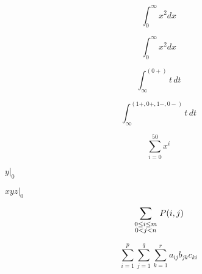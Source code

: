 \documentclass{article}
\begin{document}

\[ \int_0^\infty x^2 dx \]

\[ \int_0^\infty x^2 d\mathord{x} \]

\[ \int_\infty^{(0+)} t\,dt \]

\[ \int_\infty^{(1+,0+,1−,0−)} t\,dt \]

\[ \sum_{i=0}^{50} x^i \]

$\left. y \right|_0$

$\left. xyz \right|_0$

\[\sum_{\scriptstyle0\le i\le m\atop\scriptstyle0<j<n}P(i,j) \]

\[\sum_{i=1}^p\sum_{j=1}^q\sum_{k=1}^r a_{ij}b_{jk}c_{ki} \]
\end{document}
